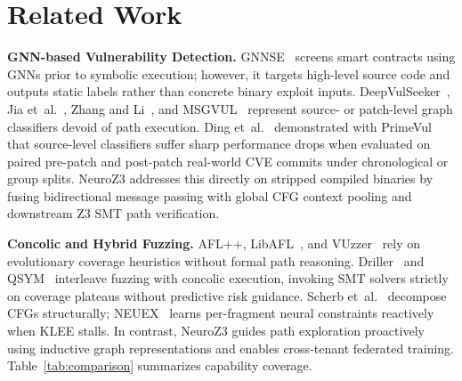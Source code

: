 \documentclass[10pt,conference]{IEEEtran}
\begin{document}
\section{Related Work}

\textbf{GNN-based Vulnerability Detection.} GNNSE~\cite{sun2026gnnse} screens smart contracts using GNNs prior to symbolic
execution; however, it targets high-level source code and outputs static labels rather than concrete binary exploit inputs.
DeepVulSeeker~\cite{wang2023deepvulseeker}, Jia et~al.~\cite{jia2025graphspd}, Zhang and Li~\cite{zhang2026gnn}, and
MSGVUL~\cite{msgvul2024} represent source- or patch-level graph classifiers devoid of path execution. Ding et~al.~\cite{ding2024primevul}
demonstrated with PrimeVul that source-level classifiers suffer sharp performance drops when evaluated on paired pre-patch and
post-patch real-world CVE commits under chronological or group splits. NeuroZ3 addresses this directly on stripped compiled binaries
by fusing bidirectional message passing with global CFG context pooling and downstream Z3 SMT path verification.

\textbf{Concolic and Hybrid Fuzzing.} AFL++, LibAFL~\cite{fioraldi2022libafl}, and VUzzer~\cite{rawat2017vuzzer} rely on evolutionary
coverage heuristics without formal path reasoning. Driller~\cite{stephens2016driller} and QSYM~\cite{yun2018qsym} interleave fuzzing
with concolic execution, invoking SMT solvers strictly on coverage plateaus without predictive risk guidance. Scherb
et~al.~\cite{scherb2024divide} decompose CFGs structurally; NEUEX~\cite{xu2020neuex} learns per-fragment neural constraints reactively
when KLEE stalls. In contrast, NeuroZ3 guides path exploration proactively using inductive graph representations and enables
cross-tenant federated training. Table~\ref{tab:comparison} summarizes capability coverage.
\end{document}
